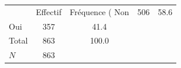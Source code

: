 {
\def\sym#1{\ifmmode^{#1}\else\(^{#1}\)\fi}
\begin{tabular}{l*{1}{cc}}
\toprule
            &    Effectif&Fréquence (%
\midrule
Non         &         506&        58.6\\
Oui         &         357&        41.4\\
Total       &         863&       100.0\\
\midrule
\(N\)       &         863&            \\
\bottomrule
\end{tabular}
}
